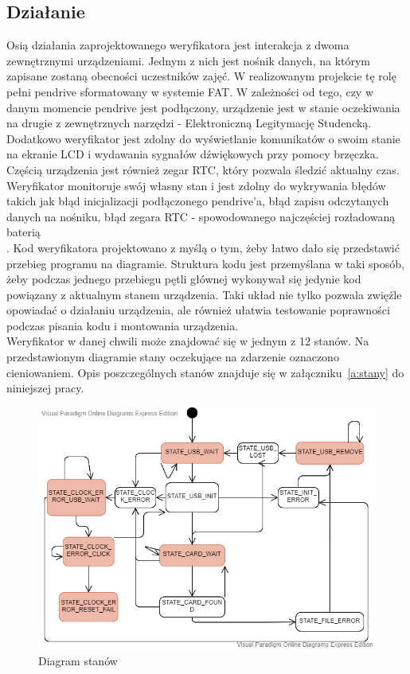\documentclass[declaration,shortabstract, mgr]{iithesis}
\begin{document}
\subsection{Działanie}
\indent Osią działania zaprojektowanego weryfikatora jest interakcja z dwoma zewnętrznymi urządzeniami. Jednym z nich jest nośnik danych, na którym zapisane zostaną obecności uczestników zajęć. W realizowanym projekcie tę rolę pełni pendrive sformatowany w systemie FAT. W zależności od tego, czy w danym momencie pendrive jest podłączony, urządzenie jest w stanie oczekiwania na drugie z zewnętrznych narzędzi - Elektroniczną Legitymację Studencką. Dodatkowo weryfikator jest zdolny do wyświetlanie komunikatów o swoim stanie na ekranie LCD i wydawania sygnałów dźwiękowych przy pomocy brzęczka. Częścią urządzenia jest również zegar RTC, który pozwala śledzić aktualny czas. Weryfikator monitoruje swój własny stan i jest zdolny do wykrywania błędów takich jak błąd inicjalizacji podłączonego pendrive'a,  błąd zapisu odczytanych danych na nośniku, błąd zegara RTC - spowodowanego najczęściej rozładowaną baterią\\.
\indent Kod weryfikatora projektowano z myślą o tym, żeby łatwo dało się przedstawić przebieg programu na diagramie. Struktura kodu jest przemyślana w taki sposób, żeby podczas jednego przebiegu pętli głównej wykonywał się jedynie kod powiązany z aktualnym stanem urządzenia. Taki układ nie tylko pozwala zwięźle opowiadać o działaniu urządzenia, ale również ułatwia testowanie poprawności podczas pisania kodu i montowania urządzenia.\\
\indent Weryfikator w danej chwili może znajdować się w jednym z 12 stanów. Na przedstawionym diagramie stany oczekujące na zdarzenie oznaczono cieniowaniem. Opis poszczególnych stanów znajduje się w załączniku~\ref{a:stany} do niniejszej pracy.
\begin{figure}[h]
\caption{Diagram stanów}
\centering
\includegraphics[scale=0.6]{state_machine.png}
\end{figure}
\end{document}
